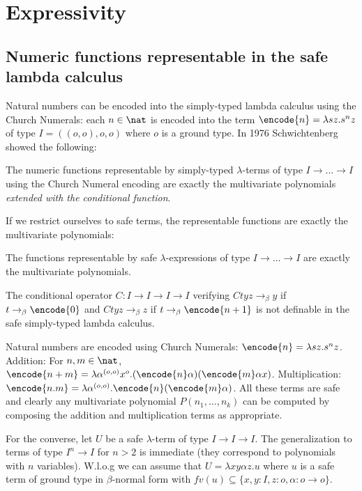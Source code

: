 \section{Expressivity}
\subsection{Numeric functions representable in the safe lambda
calculus}

Natural numbers can be encoded into the simply-typed lambda calculus
using the Church Numerals: each $n\in\nat$ is encoded into the term
$\encode{n} = \lambda s z. s^n z$ of type $I = ((o,o),o,o)$ where
$o$ is a ground type. In 1976 Schwichtenberg \cite{citeulike:622637}
showed the following:


\begin{theorem}[Schwichtenberg 1976]
The numeric functions representable by simply-typed $\lambda$-terms
of type $I\rightarrow \ldots \rightarrow I$ using the Church Numeral
encoding are exactly the multivariate polynomials \emph{extended
with the conditional function}.
\end{theorem}

If we restrict ourselves to safe terms, the representable functions
are exactly the multivariate polynomials:
\begin{theorem}
\label{thm:polychar} The functions representable by safe
$\lambda$-expressions of type $I\rightarrow \ldots \rightarrow I$
are exactly the multivariate polynomials.
\end{theorem}

\begin{corollary}
The conditional operator $C:I\rightarrow I\rightarrow I \rightarrow
I$ verifying  $C t y z \rightarrow_\beta y$  if $t \rightarrow_\beta
\encode{0}$ and $C t y z \rightarrow_\beta z$ if $t
\rightarrow_\beta \encode{n+1}$ is not definable in the safe
simply-typed lambda calculus.
\end{corollary}
\proof
  Natural numbers are encoded using Church Numerals: $\encode{n} =
  \lambda s z. s^n z$.  Addition: For $n,m \in \nat$, $\encode{n+m} =
  \lambda \alpha^{(o,o)} x^o . (\encode{n} \alpha) (\encode{m} \alpha
  x)$. Multiplication: $\encode{n . m} = \lambda \alpha^{(o,o)}
  . \encode{n} (\encode{m} \alpha)$.  All these terms are safe and
  clearly any multivariate polynomial $P(n_1, \ldots, n_k)$ can be
  computed by composing the addition and multiplication terms as
  appropriate.

For the converse, let $U$ be a safe $\lambda$-term of type
$I\rightarrow I\rightarrow I$.  The generalization to terms of type
$I^n \rightarrow I$ for $n>2$ is immediate (they correspond to
polynomials with $n$ variables). W.l.o.g we can assume that $U =
\lambda x y \alpha z. u$ where $u$ is a safe term of ground type in
$\beta$-normal form with $fv(u) \subseteq \{ x, y : I, z :o, \alpha
: o\rightarrow o \}$.

